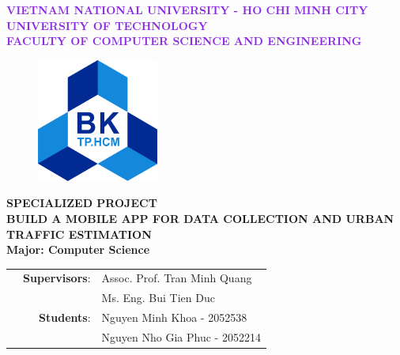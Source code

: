 \documentclass[a4paper]{article}
\begin{document}

\begin{titlepage}
\begin{center}
\large\textcolor{BlueViolet}{\textbf{
VIETNAM NATIONAL UNIVERSITY - HO CHI MINH CITY \\
UNIVERSITY OF TECHNOLOGY \\
FACULTY OF COMPUTER SCIENCE AND ENGINEERING}}
\vspace{1cm}

\begin{figure}[ht]
    \centering
    \includegraphics[width=4cm]{assets/images/hcmut.png}
\end{figure}

\begin{center}
\textbf{{\Large SPECIALIZED PROJECT}}\\
\vspace{1cm}
{\fontsize{36}{20}\selectfont %
\textbf{{BUILD A MOBILE APP FOR DATA COLLECTION AND URBAN TRAFFIC ESTIMATION}}\\
}
\vspace{1cm}
\textbf{{\Large Major: Computer Science}}
\end{center}

\vspace{1cm}

\begin{table}[h]
    \large
    \begin{tabular}{r r l}
    \hspace{4 cm} & \textbf{Supervisors}: & Assoc. Prof. Tran Minh Quang \\ 
    & & Ms. Eng. Bui Tien Duc\\
    & \textbf{Students}: & Nguyen Minh Khoa - 2052538\\
    & & Nguyen Nho Gia Phuc - 2052214 \\
    \end{tabular}
\end{table}
\vspace{2cm}


\end{center}
\end{titlepage}
\end{document}
